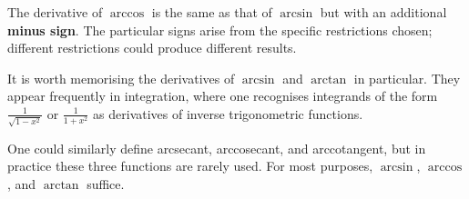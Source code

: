 \begin{remark}
The derivative of $\arccos$ is the same as that of $\arcsin$ but with an additional \textbf{minus sign}.  The particular signs arise from the specific restrictions chosen; different restrictions could produce different results.
\end{remark}

\begin{remark}
It is worth memorising the derivatives of $\arcsin$ and $\arctan$ in particular.  They appear frequently in integration, where one recognises integrands of the form $\frac{1}{\sqrt{1-x^{2}}}$ or $\frac{1}{1+x^{2}}$ as derivatives of inverse trigonometric functions.
\end{remark}

\begin{remark}
One could similarly define arcsecant, arccosecant, and arccotangent, but in practice these three functions are rarely used.  For most purposes, $\arcsin$, $\arccos$, and $\arctan$ suffice.
\end{remark}
